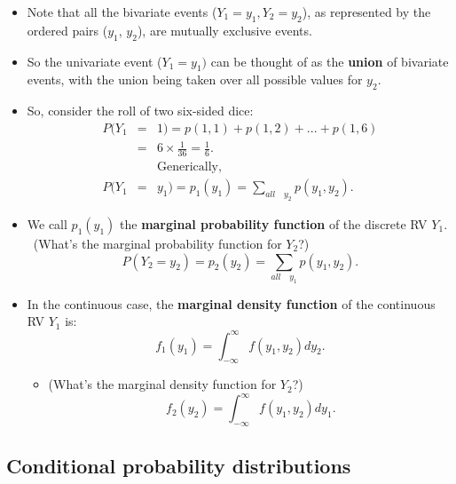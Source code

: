 \documentclass[11pt]{article}
\begin{document}
\begin{itemize}
\item Note that all the bivariate events ($Y_{1}=y_{1},Y_{2}=y_{2}$), as
represented by the ordered pairs ($y_{1}$, $y_{2}$), are mutually exclusive
events. \ 

\item So the univariate event ($Y_{1}=y_{1})$ can be thought of as the 
\textbf{union }of bivariate events, with the union being taken over all
possible values for $y_{2}$.

\item So, consider the roll of two six-sided dice:%
\begin{eqnarray*}
P(Y_{1} &=&1)=p(1,1)+p(1,2)+...+p(1,6) \\
&=&6\times \frac{1}{36}=\frac{1}{6}. \\
&&\text{Generically,} \\
P(Y_{1} &=&y_{1})=p_{1}(y_{1})=\sum_{all\quad y_{2}}p(y_{1},y_{2}).
\end{eqnarray*}

\item We call $p_{1}(y_{1})$ the \textbf{marginal probability function }of
the discrete RV $Y_{1}$. \ (What's the marginal probability function for $%
Y_{2}$?)%
\begin{equation*}
P(Y_{2}^{{}}=y_{2})=p_{2}(y_{2})=\sum_{all\quad y_{1}}p(y_{1},y_{2}).
\end{equation*}

\item In the continuous case, the \textbf{marginal density function }of the
continuous RV $Y_{1}$ is:%
\begin{equation*}
f_{1}(y_{1})=\int_{-\infty }^{\infty }f(y_{1},y_{2})dy_{2}.
\end{equation*}

\begin{itemize}
\item (What's the marginal density function for $Y_{2}$?)%
\begin{equation*}
f_{2}(y_{2})=\int_{-\infty }^{\infty }f(y_{1},y_{2})dy_{1}.
\end{equation*}
\end{itemize}
\end{itemize}

\subsection{Conditional probability distributions}
\end{document}
